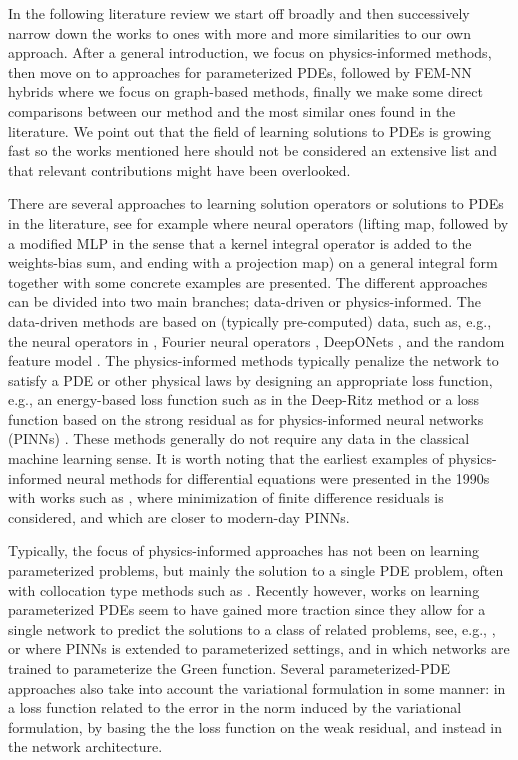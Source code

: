 \documentclass[12pt]{article}
\begin{document}
In the following literature review we start off broadly and then successively narrow down the works to ones with more and more similarities to our own approach. After a general introduction, we focus on physics-informed methods, then move on to approaches for parameterized PDEs, followed by FEM-NN hybrids where we focus on graph-based methods, finally we make some direct comparisons between our method and the most similar ones found in the literature. We point out that the field of learning solutions to PDEs is growing fast so the works mentioned here should not be considered an extensive list and that relevant contributions might have been overlooked.

There are several approaches to learning solution operators or solutions to PDEs in the literature, see for example \cite{MR4582511} where neural operators (lifting map, followed by a modified MLP in the sense that a kernel integral operator is added to the weights-bias sum, and ending with a projection map) on a general integral form together with some concrete examples are presented. The different approaches can be divided into two main branches; data-driven or physics-informed. The data-driven methods are based on (typically pre-computed) data, such as, e.g., the neural operators in \cite{Stuart_NO}, Fourier neural operators \cite{Stuart_FNO}, DeepONets \cite{Lu_et_al_DeepONets}, and the random feature model \cite{Nelsen_Stuart_21}. The physics-informed methods typically penalize the network to satisfy a PDE or other physical laws by designing an appropriate loss function, e.g., an energy-based loss function such as in the Deep-Ritz method \cite{E_etal_2018} or a loss function based on the strong residual as for physics-informed neural networks (PINNs) \cite{Raissi_etal_2019}. These methods generally do not require any data in the classical machine learning sense. It is worth noting that the earliest examples of physics-informed neural methods for differential equations were presented in the 1990s with works such as \cite{LEE1990110}, where minimization of finite difference residuals is considered, and \cite{DissanayakePhanThien1994, Lagaris1997ArtificialNN} which are closer to modern-day PINNs.

Typically, the focus of physics-informed approaches has not been on learning parameterized problems, but mainly the solution to a single PDE problem, often with collocation type methods such as \cite{E_etal_2018, Raissi_etal_2019, brink_neural_2021, mishra_artificial_2024, weng_deep_2025}. Recently however, works on learning parameterized PDEs seem to have gained more traction since they allow for a single network to predict the solutions to a class of related problems, see, e.g., \cite{URIARTE2022114562, MR4645137, heiss2023, khara_neufenet_2024}, or \cite{MR4597397, cho2024} where PINNs is extended to parameterized settings, and \cite{MR4467422} in which networks are trained to parameterize the Green function. Several parameterized-PDE approaches also take into account the variational formulation in some manner: \cite{bachmayr2024} in a loss function related to the error in the norm induced by the variational formulation, \cite{MR4756922} by basing the the loss function on the weak residual, and \cite{PATEL2024116536} instead in the network architecture.
\end{document}

